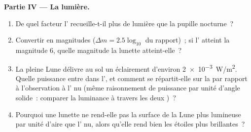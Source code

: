 \begin{problem}
\medskip
\noindent\textbf{Partie IV --- La lumière.}
\begin{enumerate}[resume]
  \item De quel facteur l' recueille-t-il plus de lumière que la
        pupille nocturne~?
  \item Convertir en magnitudes ($\Delta m = 2.5\log_{10}$ du rapport)~;
        si l' atteint la magnitude $6$, quelle magnitude la lunette
        atteint-elle~?
  \item La pleine Lune délivre au sol un éclairement d'environ
        \qty{2e-3}{W/m^2}. Quelle puissance entre dans l', et
        comment se répartit-elle sur la  par rapport à
        l'observation à l' nu (même raisonnement de puissance par
        unité d'angle solide~: comparer la luminance à travers les deux
        )~?
  \item Pourquoi une lunette ne rend-elle pas la surface de la Lune plus
        lumineuse par unité d'aire que l' nu, alors qu'elle rend bien
        les étoiles plus brillantes~?
\end{enumerate}


\end{problem}
